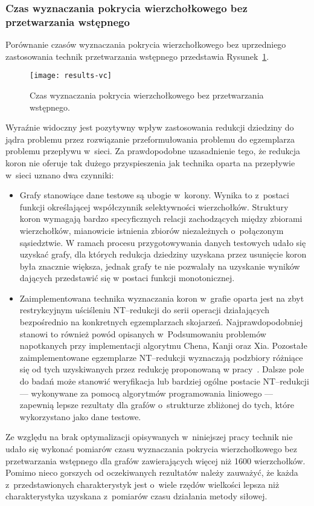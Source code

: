 \subsubsection{\textbf{Czas wyznaczania pokrycia wierzchołkowego bez przetwarzania wstępnego}}\label{time_vc}
\par{
  Porównanie czasów wyznaczania pokrycia wierzchołkowego bez uprzedniego zastosowania technik przetwarzania wstępnego przedstawia Rysunek~\ref{fig_results_vc}.
  \begin{figure}
    \centering
      \texttt{[image: results-vc]}
    \caption{Czas wyznaczania pokrycia wierzchołkowego bez przetwarzania wstępnego.}
    \label{fig_results_vc}
  \end{figure}
  Wyraźnie widoczny jest pozytywny wpływ zastosowania redukcji dziedziny do jądra problemu przez rozwiązanie przeformułowania problemu do egzemplarza problemu przepływu w~sieci.
  Za prawdopodobne uzasadnienie tego, że redukcja koron nie oferuje tak dużego przyspieszenia jak technika oparta na przepływie w~sieci uznano dwa czynniki:
  \begin{itemize}
    \item Grafy stanowiące dane testowe są ubogie w~korony.
    Wynika to z~postaci funkcji określającej współczynnik selektywności wierzchołków. Struktury koron wymagają bardzo specyficznych relacji zachodzących między zbiorami wierzchołków, mianowicie istnienia zbiorów niezależnych o~połączonym sąsiedztwie.
    W ramach procesu przygotowywania danych testowych udało się uzyskać grafy, dla których redukcja dziedziny uzyskana przez usunięcie koron była znacznie większa, jednak grafy te nie pozwalały na uzyskanie wyników dających przedstawić się w postaci funkcji monotonicznej.
    \item Zaimplementowana technika wyznaczania koron w~grafie oparta jest na zbyt restrykcyjnym uściśleniu NT--redukcji do serii operacji działających bezpośrednio na konkretnych egzemplarzach skojarzeń.
    Najprawdopodobniej stanowi to również powód opisanych w~Podsumowaniu problemów napotkanych przy implementacji algorytmu Chena, Kanji oraz Xia.
    Pozostałe zaimplementowane egzemplarze NT--redukcji wyznaczają podzbiory różniące się od tych uzyskiwanych przez redukcję proponowaną w pracy~\cite{KernelizationAlgorithms04}.
    Dalsze pole do badań może stanowić weryfikacja lub bardziej ogólne postacie NT--redukcji --- wykonywane za pomocą algorytmów programowania liniowego --- zapewnią lepsze rezultaty dla grafów o~strukturze zbliżonej do tych, które wykorzystano jako dane testowe.
  \end{itemize}

  Ze względu na brak optymalizacji opisywanych w~niniejszej pracy technik nie udało się wykonać pomiarów czasu wyznaczania pokrycia wierzchołkowego bez przetwarzania wstępnego dla grafów zawierających więcej niż 1600 wierzchołków.
  Pomimo nieco gorszych od oczekiwanych rezultatów należy zauważyć, że każda z~przedstawionych charakterystyk jest o~wiele rzędów wielkości lepsza niż charakterystyka uzyskana z~pomiarów czasu działania metody siłowej.
}
